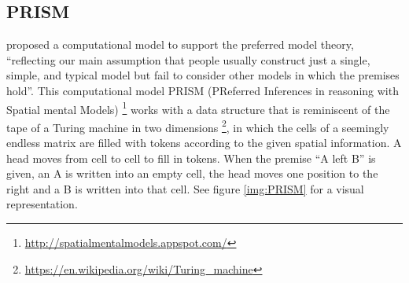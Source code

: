\documentclass[hidelinks]{scrartcl}
\begin{document}
\subsection{PRISM}\label{sec:PRISM}
\cite{Ragni.2013} proposed a computational model to support the preferred model theory, ``reflecting
our main assumption that people usually construct just a single, simple, and typical model but fail to consider other models in which the premises hold''. This computational model PRISM (PReferred Inferences in reasoning with Spatial mental Models) \footnote{\url{http://spatialmentalmodels.appspot.com/}} works with a data structure that is reminiscent of the tape of a Turing machine in two dimensions \footnote{\url{https://en.wikipedia.org/wiki/Turing_machine}}, in which the cells of a seemingly endless matrix are filled with \gls{token}s according to the given spatial information. A head moves from cell to cell to fill in \gls{token}s. When the \gls{premise} ``A left B'' is given, an A is written into an empty cell, the head moves one position to the right and a B is written into that cell. See figure \ref{img:PRISM} for a visual representation. 
\end{document}
